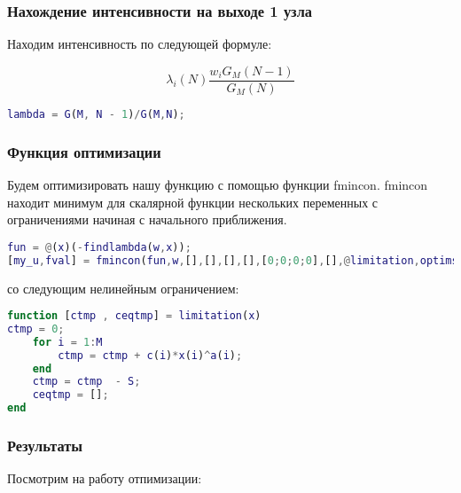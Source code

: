 \documentclass[14pt,a4paper,report]{report}
\begin{document}
\subsubsection{Нахождение интенсивности на выходе 1 узла}

Находим интенсивность по следующей формуле:

$$  \lambda_i(N)\frac{w_i G_M (N-1)}{G_M(N)}$$

\begin{lstlisting}[language={matlab}, caption={Cкрипт для нахождения интенсивности},  basicstyle=\ttfamily]
lambda = G(M, N - 1)/G(M,N);
\end{lstlisting}



\subsubsection{Функция оптимизации}

Будем оптимизировать нашу функцию с помощью функции fmincon. fmincon находит минимум для скалярной функции нескольких переменных с ограничениями начиная с начального приближения. 


\begin{lstlisting}[language={matlab}, caption={fmincon},  basicstyle=\ttfamily]
fun = @(x)(-findlambda(w,x));
[my_u,fval] = fmincon(fun,w,[],[],[],[],[0;0;0;0],[],@limitation,optimset('Display','iter'))
\end{lstlisting}

со следующим нелинейным ограничением:

\begin{lstlisting}[language={matlab}, caption={Ограничения},  basicstyle=\ttfamily]
function [ctmp , ceqtmp] = limitation(x)
ctmp = 0;
    for i = 1:M
        ctmp = ctmp + c(i)*x(i)^a(i);
    end
    ctmp = ctmp  - S;
    ceqtmp = [];
end
\end{lstlisting}



\subsubsection{Результаты}  
Посмотрим на работу отпимизации:
 
\end{document}
